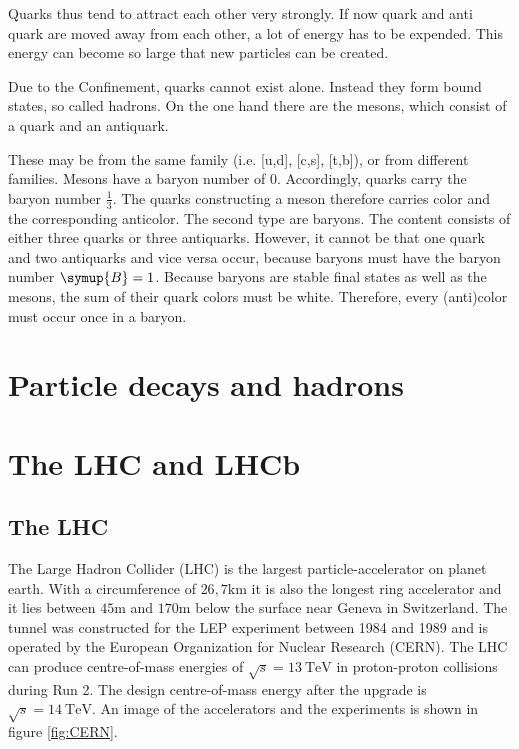 Quarks thus tend to attract each other very strongly. If now
quark and anti quark are moved away from each other, a lot of energy has to be expended. This energy can become so large that new particles can be created.

Due to the Confinement, quarks cannot exist alone. Instead they form bound states, so called hadrons. On the one hand there are the mesons, which consist of a quark
and an antiquark.

These may be from the same family (i.e. [u,d], [c,s], [t,b]), or from
different families. Mesons have a baryon number of 0. Accordingly, quarks carry the baryon number $\frac{1}{3}$. The quarks constructing a meson therefore carries color and the corresponding anticolor.
The second type are baryons. The content consists of either three quarks or
three antiquarks. However, it cannot be that one quark and two antiquarks
and vice versa occur, because baryons must have the baryon number $\symup{B} = 1$. Because baryons are stable final states as well as the mesons, the sum of their quark colors must be white. Therefore, every (anti)color must occur once in a baryon.

\section{Particle decays and hadrons}
\label{sec:decays}


\section{The LHC and LHCb}
\label{sec:lhcandB}

\subsection{The LHC}
The Large Hadron Collider (LHC)\cite{lhcInfo} is the largest particle-accelerator on planet earth. With a circumference of $26,7\si{\kilo\metre}$ it is also the longest ring accelerator and it lies between $45\si{\metre}$ and $170\si{\metre}$ below the surface near Geneva in Switzerland. The tunnel was constructed for the LEP experiment between 1984 and 1989 and is operated by the European Organization for Nuclear Research (CERN). The LHC can produce centre-of-mass energies of $\sqrt{s} = \SI{13}{\tera\electronvolt}$ in proton-proton collisions during Run 2. The design centre-of-mass energy after the upgrade is $\sqrt{s} = \SI{14}{\tera\electronvolt}$.
An image of the accelerators and the experiments is shown in figure \ref{fig:CERN}.

